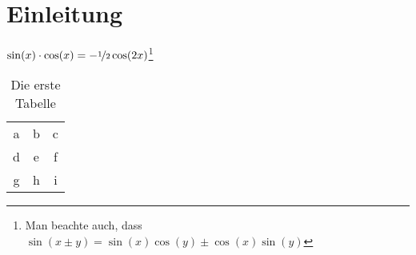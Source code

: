 
\chapter{Einleitung}

\blindtext$\sin(x)\cdot\cos(x) = -\nicefrac{1}{2} \cos(2x)$\footnote{Man beachte auch, dass $\sin(x\pm y) = \sin(x)\cos(y) \pm \cos(x)\sin(y)$}

\vfill

\begin{table}[h]
  \centering
  \begin{tabular}{ccc}
    \toprule
    a & b & c\\
    d & e & f\\
    g & h & i\\
    \bottomrule
  \end{tabular}
  \caption{Die erste Tabelle}
  \label{table - first table}
\end{table}
